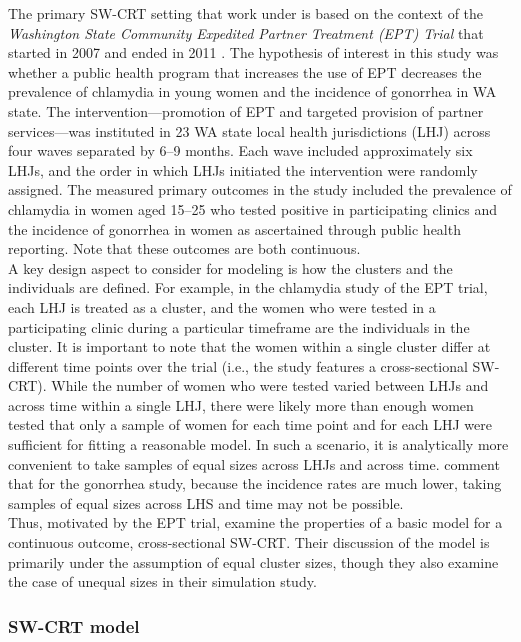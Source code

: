 \documentclass[10pt]{article}
\begin{document}
The primary SW-CRT setting that \citeauthor{Hussey:2007} work under is based on the context of the \textit{Washington State Community Expedited Partner Treatment (EPT) Trial} that started in 2007 and ended in 2011 \parencite{Golden:2015}. The hypothesis of interest in this study was whether a public health program that increases the use of EPT decreases the prevalence of chlamydia in young women and the incidence of gonorrhea in WA state. The intervention---promotion of EPT and targeted provision of partner services---was instituted in 23 WA state local health jurisdictions (LHJ) across four waves separated by 6--9 months. Each wave included approximately six LHJs, and the order in which LHJs initiated the intervention were randomly assigned. The measured primary outcomes in the study included the prevalence of chlamydia in women aged 15--25 who tested positive in participating clinics and the incidence of gonorrhea in women as ascertained through public health reporting. Note that these outcomes are both continuous.
\\

A key design aspect to consider for modeling is how the clusters and the individuals are defined. For example, in the chlamydia study of the EPT trial, each LHJ is treated as a cluster, and the women who were tested in a participating clinic during a particular timeframe are the individuals in the cluster. It is important to note that the women within a single cluster differ at different time points over the trial (i.e., the study features a cross-sectional SW-CRT). While the number of women who were tested varied between LHJs and across time within a single LHJ, there were likely more than enough women tested that only a sample of women for each time point and for each LHJ were sufficient for fitting a reasonable model. In such a scenario, it is analytically more convenient to take samples of equal sizes across LHJs and across time. \textcite{Hussey:2007} comment that for the gonorrhea study, because the incidence rates are much lower, taking samples of equal sizes across LHS and time may not be possible.
\\

Thus, motivated by the EPT trial, \citeauthor{Hussey:2007} examine the properties of a basic model for a continuous outcome, cross-sectional SW-CRT. Their discussion of the model is primarily under the assumption of equal cluster sizes, though they also examine the case of unequal sizes in their simulation study.

\subsubsection{SW-CRT model} \label{sec:model}
\end{document}

